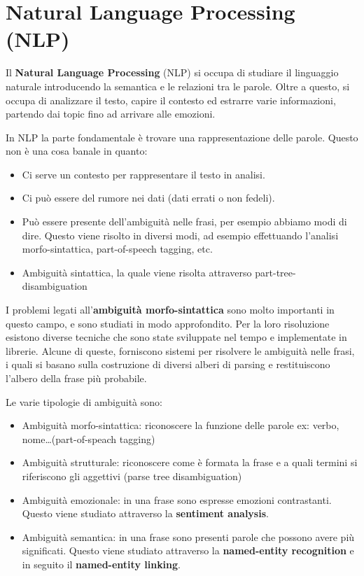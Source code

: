 \chapter{Natural Language Processing (NLP)}
Il \textbf{Natural Language Processing} (NLP) si occupa di studiare il linguaggio
naturale introducendo la semantica e le relazioni tra le parole. Oltre a questo,
si occupa di analizzare il testo, capire il contesto ed estrarre varie informazioni,
partendo dai topic fino ad arrivare alle emozioni.

In NLP la parte fondamentale è trovare una rappresentazione delle parole. Questo
non è una cosa banale in quanto:
\begin{itemize}
      \item Ci serve un contesto per rappresentare il testo in analisi.
      \item Ci può essere del rumore nei dati (dati errati o non fedeli).
      \item Può essere presente dell'ambiguità nelle frasi, per esempio abbiamo
            modi di dire. Questo viene risolto in diversi modi, ad esempio
            effettuando l'analisi morfo-sintattica, part-of-speech tagging, etc.
      \item Ambiguità sintattica, la quale viene risolta attraverso part-tree-disambiguation
\end{itemize}
I problemi legati all'\textbf{ambiguità morfo-sintattica} sono molto importanti
in questo campo, e sono studiati in modo approfondito. Per la loro risoluzione
esistono diverse tecniche che sono state sviluppate nel tempo e implementate in
librerie. Alcune di queste, forniscono sistemi per risolvere le ambiguità nelle
frasi, i quali si basano sulla costruzione di diversi alberi di parsing e
restituiscono l'albero della frase più probabile.

Le varie tipologie di ambiguità sono:
\begin{itemize}
      \item Ambiguità morfo-sintattica: riconoscere la funzione delle parole ex: verbo, nome\dots (part-of-speach tagging)
      \item Ambiguità strutturale: riconoscere come è formata la frase e a quali termini si riferiscono gli aggettivi (parse tree disambiguation)
      \item Ambiguità emozionale: in una frase sono espresse emozioni contrastanti.
            Questo viene studiato attraverso la \textbf{sentiment analysis}.
      \item Ambiguità semantica: in una frase sono presenti parole che possono
            avere più significati. Questo viene studiato attraverso la
            \textbf{named-entity recognition} e in seguito il \textbf{named-entity
                  linking}.
\end{itemize}
